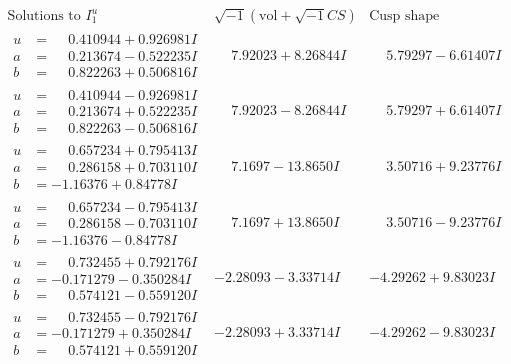 \documentclass[1p]{elsarticle_modified}
\theoremstyle{definition}
\newcommand{\I}{\sqrt{-1}}
\begin{document}
$$\begin{array}{c|c|c}  
\text{Solutions to }I^u_{1}& \I (\text{vol} + \sqrt{-1}CS) & \text{Cusp shape}\\
 \hline 
\begin{aligned}
u &= \phantom{-}0.410944 + 0.926981 I \\
a &= \phantom{-}0.213674 - 0.522235 I \\
b &= \phantom{-}0.822263 + 0.506816 I\end{aligned}
 & \phantom{-}7.92023 + 8.26844 I & \phantom{-}5.79297 - 6.61407 I \\ \hline\begin{aligned}
u &= \phantom{-}0.410944 - 0.926981 I \\
a &= \phantom{-}0.213674 + 0.522235 I \\
b &= \phantom{-}0.822263 - 0.506816 I\end{aligned}
 & \phantom{-}7.92023 - 8.26844 I & \phantom{-}5.79297 + 6.61407 I \\ \hline\begin{aligned}
u &= \phantom{-}0.657234 + 0.795413 I \\
a &= \phantom{-}0.286158 + 0.703110 I \\
b &= -1.16376 + 0.84778 I\end{aligned}
 & \phantom{-}7.1697 - 13.8650 I & \phantom{-}3.50716 + 9.23776 I \\ \hline\begin{aligned}
u &= \phantom{-}0.657234 - 0.795413 I \\
a &= \phantom{-}0.286158 - 0.703110 I \\
b &= -1.16376 - 0.84778 I\end{aligned}
 & \phantom{-}7.1697 + 13.8650 I & \phantom{-}3.50716 - 9.23776 I \\ \hline\begin{aligned}
u &= \phantom{-}0.732455 + 0.792176 I \\
a &= -0.171279 - 0.350284 I \\
b &= \phantom{-}0.574121 - 0.559120 I\end{aligned}
 & -2.28093 - 3.33714 I & -4.29262 + 9.83023 I \\ \hline\begin{aligned}
u &= \phantom{-}0.732455 - 0.792176 I \\
a &= -0.171279 + 0.350284 I \\
b &= \phantom{-}0.574121 + 0.559120 I\end{aligned}
 & -2.28093 + 3.33714 I & -4.29262 - 9.83023 I \\ \hline\begin{aligned}

\end{aligned}
\end{array}$$
\end{document}
